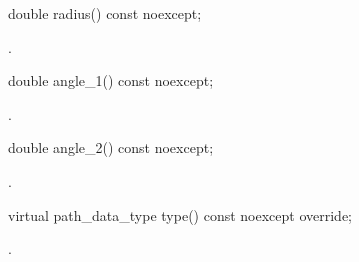 \begin{itemdecl}
    double radius() const noexcept;
\end{itemdecl}
\begin{itemdescr}
	\pnum
	\returns
	.

\end{itemdescr}

\begin{itemdecl}
    double angle_1() const noexcept;
\end{itemdecl}
\begin{itemdescr}
	\pnum
	\returns
	.

\end{itemdescr}

\begin{itemdecl}
    double angle_2() const noexcept;
\end{itemdecl}
\begin{itemdescr}
	\pnum
	\returns
	.

\end{itemdescr}

\begin{itemdecl}
    virtual path_data_type type() const noexcept override;
\end{itemdecl}
\begin{itemdescr}
	\pnum
	\returns
	.

\end{itemdescr}
